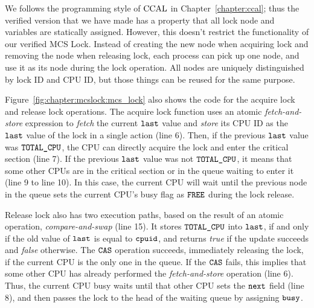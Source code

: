 We follows the programming style of $\mathrm{CCAL}$ in Chapter~\ref{chapter:ccal}; thus
the verified version that we have made has a property that all lock node and variables are statically assigned.
However, this doesn't restrict the functionality of our verified MCS Lock.
Instead of creating the new node when acquiring lock and removing the node when releasing lock,
each process can pick up one node, and use it as its node during the lock operation. 
All nodes are uniquely distinguished by lock ID and CPU ID, but those
things can be reused for the same purpose.

Figure~\ref{fig:chapter:mcslock:mcs_lock} also shows the code for the acquire lock and
release lock operations.  The acquire lock function uses an atomic {\em
fetch-and-store} expression to {\em fetch} the current ${\mathrm{\texttt{last}}}$
value and {\em store} its CPU ID as the ${\mathrm{\texttt{last}}}$ value of
the lock in a single action (line 6).  Then, if the previous ${\mathrm{\texttt{last}}}$ value
was ${\mathrm{\texttt{TOTAL\_CPU}}}$, the CPU can directly acquire the lock and enter the
critical section (line 7).  If the previous ${\mathrm{\texttt{last}}}$ value was not
${\mathrm{\texttt{TOTAL\_CPU}}}$, it means that some other CPUs are in the critical
section or in the queue waiting to enter it (line 9 to line 10).  In
this case, the current CPU will wait until the previous node in the
queue sets the current CPU's busy flag as ${\mathrm{\texttt{FREE}}}$ during the lock
release.

Release lock also has two execution paths, based on the result of an atomic operation, {\em compare-and-swap} (line 15).
It stores ${\mathrm{\texttt{TOTAL\_CPU}}}$ into ${\mathrm{\texttt{last}}}$, if and only if the old value
of ${\mathrm{\texttt{last}}}$ is equal to ${\mathrm{\texttt{cpuid}}}$, and returns {\em
  true} if the update succeeds and {\em false} otherwise.
The ${\mathrm{\texttt{CAS}}}$ operation succeeds, immediately releasing the lock,
if the current CPU is the only one in the queue.
If the ${\mathrm{\texttt{CAS}}}$ fails, this implies that some other CPU has
already performed the {\em fetch-and-store} operation (line 6). Thus, the current CPU busy waits until that other CPU sets the
${\mathrm{\texttt{next}}}$ field  (line 8), and then passes the lock to the head of the
waiting queue by assigning ${\mathrm{\texttt{busy}}}$.

